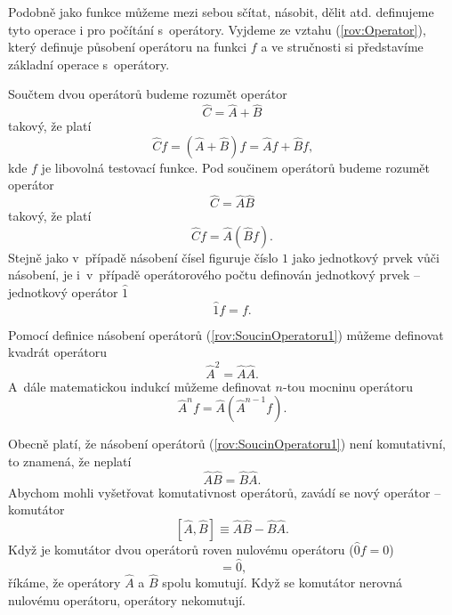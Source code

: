 Podobně jako funkce můžeme mezi sebou sčítat, násobit, dělit atd. definujeme tyto operace i pro počítání s~operátory. Vyjdeme ze vztahu (\ref{rov:Operator}), který definuje působení operátoru na funkci $f$ a ve stručnosti si představíme základní operace s~operátory.

Součtem dvou operátorů budeme rozumět operátor
\begin{equation}
\hat{C} = \hat{A}+\hat{B}
\label{rov:SoucetOperatoru1}
\end{equation}
takový, že platí
\begin{equation}
\hat{C}f = (\hat{A}+\hat{B})f=\hat{A}f + \hat{B}f \mbox{,}
\label{rov:SoucetOperatoru2}
\end{equation}
kde $f$ je libovolná testovací funkce. Pod součinem operátorů budeme rozumět operátor
\begin{equation}
\hat{C} = \hat{A}\hat{B}
\label{rov:SoucinOperatoru1}
\end{equation}
takový, že platí
\begin{equation}
\hat{C}f = \hat{A}(\hat{B}f) \mbox{.}
\label{rov:SoucinOperatoru2}
\end{equation}
Stejně jako v~případě násobení čísel figuruje číslo $1$ jako jednotkový prvek vůči násobení, je i~v~případě operátorového počtu definován jednotkový prvek -- jednotkový operátor $\hat{1}$
\begin{equation}
\hat{1} f = f \mbox{.}
\label{rov:JednotkovyOperator}
\end{equation}

Pomocí definice násobení operátorů (\ref{rov:SoucinOperatoru1}) můžeme definovat kvadrát operátoru
\begin{equation}
\hat{A}^2 = \hat{A}\hat{A} \mbox{.}
\label{rov:KvadratOperatoru} 
\end{equation}
A~dále matematickou indukcí můžeme definovat $n$-tou mocninu operátoru
\begin{equation}
\hat{A}^n f = \hat{A} (\hat{A}^{n-1} f) \mbox{.}
\label{rov:MocninaOperatoru}
\end{equation}

Obecně platí, že násobení operátorů (\ref{rov:SoucinOperatoru1}) není komutativní, to znamená, že neplatí
\begin{equation}
\hat{A}\hat{B} = \hat{B}\hat{A} \mbox{.}
\label{rov:KomutativnostOperatoru}
\end{equation}
Abychom mohli vyšetřovat komutativnost operátorů, zavádí se nový operátor -- komutátor
\begin{equation}
\boxed{[\hat{A},\hat{B}] \equiv \hat{A}\hat{B}-\hat{B}\hat{A} \mbox{.}}
\label{rov:KomutatorOperatoru}
\end{equation}
Když je komutátor dvou operátorů roven nulovému operátoru ($\hat{0}f=0$)
\begin{equation}
[\hat{A},\hat{B}] = \hat{0} \mbox{,}
\label{rov:Komutator1}
\end{equation}
říkáme, že operátory $\hat{A}$ a $\hat{B}$ spolu komutují. Když se komutátor nerovná nulovému operátoru, operátory nekomutují.


